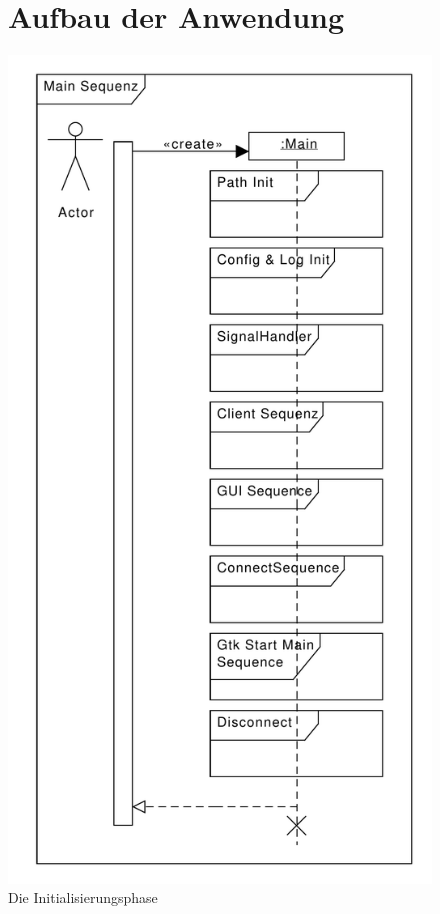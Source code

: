 \begin{figure}
\section{Aufbau der Anwendung}
	\centering
        \includegraphics[scale=0.5]{./gfx/seq/main}
	\caption{Die Initialisierungsphase}
	\label{seq_main_init}
\end{figure}





